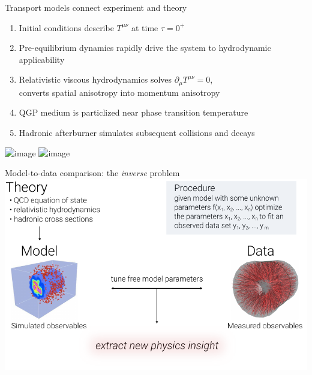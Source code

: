 \documentclass{beamer}
\begin{document}
\begin{frame}[plain,t]{Transport models connect experiment and theory}
  \vspace{.075\textheight}
  \begin{enumerate}
    \small
  \item Initial conditions describe $T^{\mu\nu}$ at time $\tau=0^+$
    \item Pre-equilibrium dynamics rapidly drive the system to hydrodynamic applicability
    \item Relativistic viscous hydrodynamics solves $\partial_\mu T^{\mu\nu}=0$,\\
      converts spatial anisotropy into momentum anisotropy
    \item QGP medium is particlized near phase transition temperature
    \item Hadronic afterburner simulates subsequent collisions and decays
  \end{enumerate}
  \includegraphics<1>[width=\textwidth]{hic_picture1}
  \includegraphics<2>[width=\textwidth]{hic_picture3}
\end{frame}


\begin{frame}{Model-to-data comparison: the \emph{inverse} problem}
  \centering \vspace{0.1\textheight}
  \includegraphics[width=\textwidth]{model2data}
\end{frame}
\end{document}
